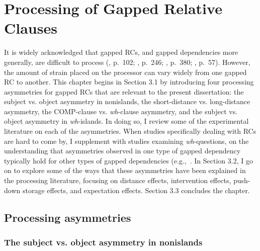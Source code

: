 
\chapter{Processing of Gapped Relative Clauses}\label{ch-gapping}


It is widely acknowledged that gapped RCs, and gapped dependencies more generally, are difficult to process (\cite{goodall2004}, p.~102; \cite{hawkins1999}, p.~246; \cite{hofmeister.sag2010}, p.~380; \cite{ogrady2022a}, p.~57). However, the amount of strain placed on the processor can vary widely from one gapped RC to another. This chapter begins in Section 3.1 by introducing four processing asymmetries for gapped RCs that are relevant to the present dissertation: the subject vs. object asymmetry in nonislands, the short-distance vs. long-distance asymmetry, the COMP-clause vs. \textit{wh}-clause asymmetry, and the subject vs. object asymmetry in \textit{wh}-islands. In doing so, I review some of the experimental literature on each of the asymmetries. When studies specifically dealing with RCs are hard to come by, I supplement with studies examining \textit{wh}-questions, on the understanding that asymmetries observed in one type of gapped dependency\footnotemark{} typically hold for other types of gapped dependencies (e.g.,~\cite{friedmann.etal2009,schippers.etal2019}. In Section 3.2, I go on to explore some of the ways that these asymmetries have been explained in the processing literature, focusing on distance effects, intervention effects, push-down storage effects, and expectation effects. Section 3.3 concludes the chapter.


\section{Processing asymmetries}\label{gap-asymmetry}

\subsection{The subject vs. object asymmetry in nonislands}\label{gap-so}

